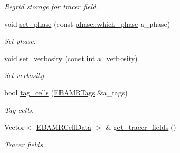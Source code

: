 \begin{DoxyCompactItemize}
\begin{DoxyCompactList}\small\item\em Regrid storage for tracer field. \end{DoxyCompactList}\item 
void \hyperlink{classcell__tagger_af7ff4270108c5d6bf6a6eab1a6827f59}{set\+\_\+phase} (const \hyperlink{namespacephase_a23c76f548a5eb1955ed8c929c541108b}{phase\+::which\+\_\+phase} a\+\_\+phase)
\begin{DoxyCompactList}\small\item\em Set phase. \end{DoxyCompactList}\item 
void \hyperlink{classcell__tagger_af66222ac0e75f1a29362795c58d1b5d9}{set\+\_\+verbosity} (const int a\+\_\+verbosity)
\begin{DoxyCompactList}\small\item\em Set verbosity. \end{DoxyCompactList}\item 
bool \hyperlink{classcell__tagger_a5fb636f53318de05f0889d4e2aca0bae}{tag\+\_\+cells} (\hyperlink{type__definitions_8H_a4eb540da9eb275c3e4225830ae526113}{E\+B\+A\+M\+R\+Tags} \&a\+\_\+tags)
\begin{DoxyCompactList}\small\item\em Tag cells. \end{DoxyCompactList}\item 
Vector$<$ \hyperlink{type__definitions_8H_a7e610f301989e5e07781c5e338bdb7c3}{E\+B\+A\+M\+R\+Cell\+Data} $>$ \& \hyperlink{classcell__tagger_a96bbcfa8bd9e64a72a3e16f754b7dd1f}{get\+\_\+tracer\+\_\+fields} ()
\begin{DoxyCompactList}\small\item\em Tracer fields. \end{DoxyCompactList}\end{DoxyCompactItemize}
